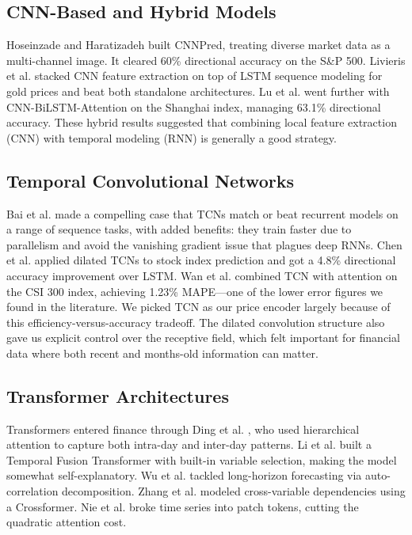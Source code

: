 \documentclass[conference]{IEEEtran}
\begin{document}
\subsection{CNN-Based and Hybrid Models}
Hoseinzade and Haratizadeh \cite{hoseinzade2019} built CNNPred, treating diverse market data as a multi-channel image. It cleared 60\% directional accuracy on the S\&P 500. Livieris et al. \cite{livieris2020} stacked CNN feature extraction on top of LSTM sequence modeling for gold prices and beat both standalone architectures. Lu et al. \cite{lu2021} went further with CNN-BiLSTM-Attention on the Shanghai index, managing 63.1\% directional accuracy. These hybrid results suggested that combining local feature extraction (CNN) with temporal modeling (RNN) is generally a good strategy.

\subsection{Temporal Convolutional Networks}
Bai et al. \cite{bai2018} made a compelling case that TCNs match or beat recurrent models on a range of sequence tasks, with added benefits: they train faster due to parallelism and avoid the vanishing gradient issue that plagues deep RNNs. Chen et al. \cite{chen2020tcn} applied dilated TCNs to stock index prediction and got a 4.8\% directional accuracy improvement over LSTM. Wan et al. \cite{wan2021} combined TCN with attention on the CSI 300 index, achieving 1.23\% MAPE---one of the lower error figures we found in the literature. We picked TCN as our price encoder largely because of this efficiency-versus-accuracy tradeoff. The dilated convolution structure also gave us explicit control over the receptive field, which felt important for financial data where both recent and months-old information can matter.

\subsection{Transformer Architectures}
Transformers entered finance through Ding et al. \cite{ding2020}, who used hierarchical attention to capture both intra-day and inter-day patterns. Li et al. \cite{li2023transformer} built a Temporal Fusion Transformer with built-in variable selection, making the model somewhat self-explanatory. Wu et al. \cite{wu2022autoformer} tackled long-horizon forecasting via auto-correlation decomposition. Zhang et al. \cite{zhang2023} modeled cross-variable dependencies using a Crossformer. Nie et al. \cite{nie2023patchtst} broke time series into patch tokens, cutting the quadratic attention cost.
\end{document}
